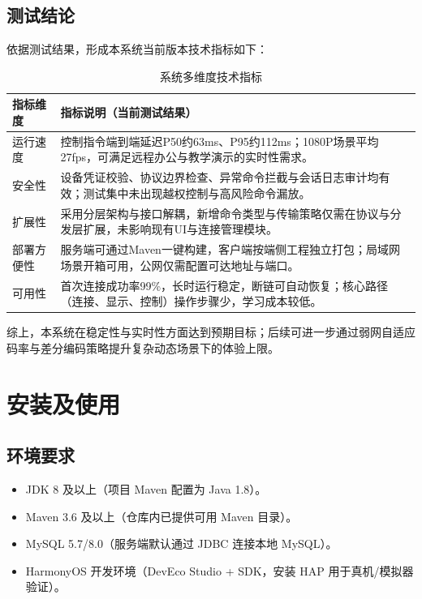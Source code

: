 \documentclass[UTF8,fontset=none]{ctexart}
\begin{document}
\subsection{测试结论}
依据测试结果，形成本系统当前版本技术指标如下：
\begin{table}[H]
\centering
\caption{系统多维度技术指标}
\small
\setlength{\tabcolsep}{5pt}
\renewcommand{\arraystretch}{1.2}
\begin{tabular}{p{2.3cm}p{8.5cm}}
\toprule
指标维度 & 指标说明（当前测试结果） \\
\midrule
运行速度 & 控制指令端到端延迟P50约63ms、P95约112ms；1080P场景平均27fps，可满足远程办公与教学演示的实时性需求。 \\
安全性 & 设备凭证校验、协议边界检查、异常命令拦截与会话日志审计均有效；测试集中未出现越权控制与高风险命令漏放。 \\
扩展性 & 采用分层架构与接口解耦，新增命令类型与传输策略仅需在协议与分发层扩展，未影响现有UI与连接管理模块。 \\
部署方便性 & 服务端可通过Maven一键构建，客户端按端侧工程独立打包；局域网场景开箱可用，公网仅需配置可达地址与端口。 \\
可用性 & 首次连接成功率99\%，长时运行稳定，断链可自动恢复；核心路径（连接、显示、控制）操作步骤少，学习成本较低。 \\
\bottomrule
\end{tabular}
\end{table}

综上，本系统在稳定性与实时性方面达到预期目标；后续可进一步通过弱网自适应码率与差分编码策略提升复杂动态场景下的体验上限。

\newpage
\section{安装及使用}

\subsection{环境要求}
\begin{itemize}
	\item JDK 8 及以上（项目 Maven 配置为 Java 1.8）。
	\item Maven 3.6 及以上（仓库内已提供可用 Maven 目录）。
	\item MySQL 5.7/8.0（服务端默认通过 JDBC 连接本地 MySQL）。
	\item HarmonyOS 开发环境（DevEco Studio + SDK，安装 HAP 用于真机/模拟器验证）。
\end{itemize}
\end{document}
